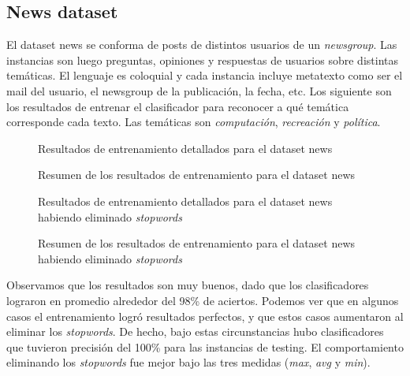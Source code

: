 \documentclass[a4paper,10pt]{article}
\begin{document}
\vspace{20pt}

\subsection{\textsf{News} dataset}

El dataset \textsf{news} se conforma de posts de distintos usuarios de un \emph{newsgroup}. Las instancias son luego preguntas, opiniones y respuestas de usuarios sobre distintas temáticas. El lenguaje es coloquial y cada instancia incluye metatexto como ser el mail del usuario, el newsgroup de la publicación, la fecha, etc. Los siguiente son los resultados de entrenar el clasificador para reconocer a qué temática corresponde cada texto. Las temáticas son \emph{computación}, \emph{recreación} y \emph{política}.

\begin{multicols}{2}
\begin{figure}[H]
    \centering
    
    \caption{Resultados de entrenamiento detallados para el dataset \textsf{news}}
\end{figure}
\begin{figure}[H]
    \centering
    \begin{minipage}{0.35\textwidth}
    
    \end{minipage}
    \caption{Resumen de los resultados de entrenamiento para el dataset \textsf{news}}
\end{figure}

\begin{figure}[H]
    \centering
    
    \caption{Resultados de entrenamiento detallados para el dataset \textsf{news} habiendo eliminado \emph{stopwords}}
\end{figure}
\begin{figure}[H]
    \centering
    \begin{minipage}{0.35\textwidth}
    
    \end{minipage}
    \caption{Resumen de los resultados de entrenamiento para el dataset \textsf{news} habiendo eliminado \emph{stopwords}}
\end{figure}
\end{multicols}

Observamos que los resultados son muy buenos, dado que los clasificadores lograron en promedio alrededor del 98\% de aciertos. Podemos ver que en algunos casos el entrenamiento logró resultados perfectos, y que estos casos aumentaron al eliminar los \emph{stopwords}. De hecho, bajo estas circunstancias hubo clasificadores que tuvieron precisión del 100\% para las instancias de testing. El comportamiento eliminando los \emph{stopwords} fue mejor bajo las tres medidas (\emph{max}, \emph{avg} y \emph{min}).
\end{document}
